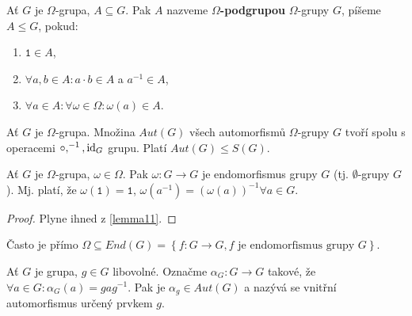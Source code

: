 \begin{definice}
	Ať $G$ je $\Omega$-grupa, $A\subseteq G$. Pak $A$ nazveme \textbf{$\Omega$-podgrupou} $\Omega$-grupy $G$,
	píšeme $A\leq G$, pokud:
	\begin{enumerate}[($i$)]
		\item $\mathtt 1\in A$,
		\item $\forall a,b \in A:a\cdot b\in A$ a $a^{-1}\in A$,
		\item $\forall a \in A:\forall \omega \in \Omega: \omega(a)\in A$.
    \end{enumerate}
\end{definice}

\begin{dusledek}
	Ať $G$ je $\Omega$-grupa. Množina $Aut(G)$ všech automorfismů $\Omega$-grupy $G$ tvoří spolu s
	operacemi $\circ, ^{-1},\mathrm{id}_G$ grupu. Platí $Aut(G)\leq S(G).$
\end{dusledek}

\begin{dusledek}
	Ať $G$ je $\Omega$-grupa, $\omega\in \Omega$. Pak $\omega:G\to G$ je endomorfismus grupy $G$
	(tj. $\emptyset$-grupy $G$). Mj. platí, že $\omega(\mathtt 1)=\mathtt 1$, $\omega \left( a^{-1} \right ) = \left( \omega(a) \right )^{-1} \forall a \in G.$
\end{dusledek}

\begin{proof}
	Plyne ihned z \ref{lemma11}.
\end{proof}

\begin{poznamka}
	Často je přímo $\Omega \subseteq End(G)=\left \{ f:G\to G,f \textrm{ je endomorfismus grupy }G \right \} $.
\end{poznamka}

\begin{lemma}
	Ať $G$ je grupa, $g\in G$ libovolné. Označme $\alpha_G:G\to G$ takové, že $\forall a \in G:\alpha_G (a)=gag^{-1}$.
	Pak je $\alpha_g\in Aut(G)$ a nazývá se vnitřní automorfismus určený prvkem $g$.
\end{lemma}
